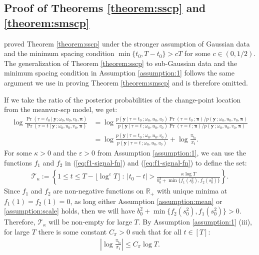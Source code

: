 \subsection{Proof of Theorems \ref{theorem:sscp} and \ref{theorem:smscp}}
\label{app:localization-smscp}

\cite{Cappello22} proved Theorem \ref{theorem:sscp} under the stronger assumption of Gaussian data and the minimum spacing condition $\min \{t_0, T-t_0\} > cT$ for some $c \in (0,1/2)$. The generalization of Theorem \ref{theorem:sscp} to sub-Gaussian data and the minimum spacing condition in Assumption \ref{assumption:1} follows the same argument we use in proving Theorem \ref{theorem:smscp} and is therefore omitted.

If we take the ratio of the posterior probabilities of the change-point location from the meanvar-scp model, we get:
\begin{align*}
    \log \frac{\Pr(\tau = t_0  \:|\: \mathbf{y} ; \omega_0, u_0, v_0,\boldsymbol{\pi})}{\Pr(\tau = t  \:|\: \mathbf{y} \:; \omega_0, u_0, v_0,\boldsymbol{\pi})} &=  \log \frac{p(\mathbf{y} \:|\:\tau = t_0 \:; \omega_0, u_0, v_0)\Pr(\tau = t_0 \:; \boldsymbol{\pi})/ p(\mathbf{y}\:;\omega_0, u_0, v_0,\boldsymbol{\pi})}{p(\mathbf{y} \:|\:\tau = t \:; \omega_0, u_0, v_0)\Pr(\tau = t \:;\boldsymbol{\pi})/ p(\mathbf{y}\:;\omega_0, u_0, v_0,\boldsymbol{\pi})} \tag{Bayes' rule} \\
    &= \log \frac{p(\mathbf{y} \:|\:\tau = t_0 \:; \omega_0, u_0, v_0)}{p(\mathbf{y} \:|\:\tau = t \:; \omega_0, u_0, v_0)} + \log\frac{\pi_{t_0}}{\pi_t}.
\end{align*}
For some $\kappa > 0$ and the $\varepsilon>0$ from Assumption \ref{assumption:1}, we can use the functions $f_1$ and $f_2$ in (\ref{eq:f1-signal-fn}) and (\ref{eq:f1-signal-fn}) to define the set:
\begin{align*}
    \mathcal{T}_{\kappa}:= \left\{1\leq t \leq T - \lfloor\log^{\varepsilon} T\rfloor\::\: |t_0 - t| > \frac{\kappa\log T}{b^2_0 + \min\{f_1(s_0^2),f_2(s_0^2)\}} \right\}.
\end{align*}
Since $f_1$ and $f_2$ are non-negative functions on $\mathbb{R}_+$ with unique minima at $f_1(1) = f_2(1) = 0$, as long either Assumption \ref{assumption:mean} or \ref{assumption:scale} holds, then we will have $b^2_0 + \min\{f_2(s_0^2),f_1(s_0^2)\}> 0$. Therefore, $\mathcal{T}_{\kappa}$ will be non-empty for large $T$. By Assumption \ref{assumption:1} (iii), for large $T$ there is some constant $C_\pi > 0$ such that for all $t \in [T]$: 
\begin{align}
    \left|\log \frac{\pi_{t_0}}{\pi_t}\right| \leq C_\pi \log T.
\end{align}
